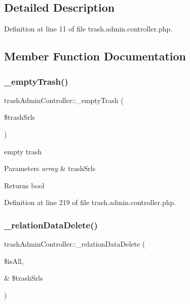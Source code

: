 \subsection{Detailed Description}


Definition at line 11 of file trash.\+admin.\+controller.\+php.



\subsection{Member Function Documentation}
\mbox{\label{classtrashAdminController_adaff8ae03021995e529e1c8f6510ff24}} 
\subsubsection{\texorpdfstring{\+\_\+empty\+Trash()}{\_emptyTrash()}}
{\footnotesize\ttfamily trash\+Admin\+Controller\+::\+\_\+empty\+Trash (\begin{DoxyParamCaption}\item[{}]{\$trash\+Srls }\end{DoxyParamCaption})}

empty trash 
\begin{DoxyParams}{Parameters}
{\em array} & trash\+Srls \\
\hline
\end{DoxyParams}
\begin{DoxyReturn}{Returns}
bool 
\end{DoxyReturn}


Definition at line 219 of file trash.\+admin.\+controller.\+php.

\mbox{\label{classtrashAdminController_a6f402d0113009b914de8665786d95ae9}} 
\subsubsection{\texorpdfstring{\+\_\+relation\+Data\+Delete()}{\_relationDataDelete()}}
{\footnotesize\ttfamily trash\+Admin\+Controller\+::\+\_\+relation\+Data\+Delete (\begin{DoxyParamCaption}\item[{}]{\$is\+All,  }\item[{\&}]{\$trash\+Srls }\end{DoxyParamCaption})}


